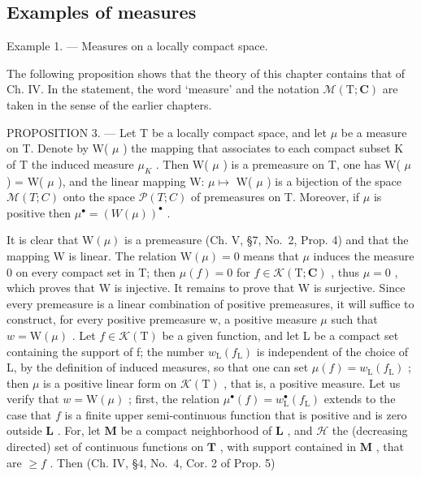 \subsection{Examples of measures}

Example 1. --- Measures on a locally compact space.

The following proposition shows that the theory of this chapter contains that of Ch. IV. In the statement, the word `measure' and the notation \(\mathcal{M}(\mathrm{T};\mathbf{C})\) are taken in the sense of the earlier chapters.

PROPOSITION 3. --- Let T be a locally compact space, and let \(\mu\) be a measure on T. Denote by W( \(\mu\) ) the mapping that associates to each compact subset K of T the induced measure \(\mu_{K}\) . Then W( \(\mu\) ) is a premeasure on T, one has W(\textbar{} \(\mu\) \textbar) = \textbar W( \(\mu\) )\textbar, and the linear mapping W: \(\mu \mapsto\) W( \(\mu\) ) is a bijection of the space \(\mathcal{M}(T;C)\) onto the space \(\mathcal{P}(T;C)\) of premeasures on T. Moreover, if \(\mu\) is positive then \(\mu^{\bullet} = (W(\mu))^{\bullet}\) .

It is clear that \(\mathrm{W}(\mu)\) is a premeasure (Ch. V, §7, No.~2, Prop. 4) and that the mapping W is linear. The relation \(\mathrm{W}(\mu)=0\) means that \(\mu\) induces the measure 0 on every compact set in T; then \(\mu(f)=0\) for \(f\in\mathcal{K}(\mathrm{T};\mathbf{C})\) , thus \(\mu=0\) , which proves that W is injective. It remains to prove that W is surjective. Since every premeasure is a linear combination of positive premeasures, it will suffice to construct, for every positive premeasure w, a positive measure \(\mu\) such that \(w=\mathrm{W}(\mu)\) . Let \(f\in\mathcal{K}(\mathrm{T})\) be a given function, and let L be a compact set containing the support of f; the number \(w_{\mathrm{L}}(f_{\mathrm{L}})\) is independent of the choice of L, by the definition of induced measures, so that one can set \(\mu(f)=w_{\mathrm{L}}(f_{\mathrm{L}})\) ; then \(\mu\) is a positive linear form on \(\mathcal{K}(\mathrm{T})\) , that is, a positive measure. Let us verify that \(w = \mathrm{W}(\mu)\) ; first, the relation \(\mu^{\bullet}(f) = w_{\mathrm{L}}^{\bullet}(f_{\mathrm{L}})\) extends to the case that \(f\) is a finite upper semi-continuous function that is positive and is zero outside \(\mathbf{L}\) . For, let \(\mathbf{M}\) be a compact neighborhood of \(\mathbf{L}\) , and \(\mathcal{H}\) the (decreasing directed) set of continuous functions on \(\mathbf{T}\) , with support contained in \(\mathbf{M}\) , that are \(\geqslant f\) . Then (Ch. IV, §4, No.~4, Cor. 2 of Prop. 5)

